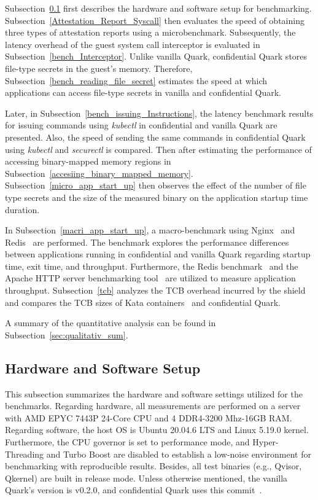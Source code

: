 Subsection~\ref{Hardware_and_Software_Setup} first describes the hardware and software setup for benchmarking. Subsection~\ref{Attestation_Report_Syscall} then evaluates the speed of obtaining three types of attestation reports using a microbenchmark. Subsequently, the latency overhead of the guest system 
call interceptor is evaluated in Subsection~\ref{bench_Interceptor}. Unlike vanilla Quark, confidential Quark stores file-type secrets in the guest's memory. Therefore, Subsection~\ref{bench_reading_file_secret} estimates the speed at which applications can access file-type secrets in vanilla and confidential Quark.
 
Later, in Subsection~\ref{bench_issuing_Instructions}, the latency benchmark results for issuing commands using \emph{kubectl} in confidential and vanilla Quark are presented. Also, the speed of sending the same commands in confidential Quark using \emph{kubectl} and \emph{securectl} is compared. Then after 
estimating the performance of accessing binary-mapped memory regions in Subsection~\ref{accesiing_binary_mapped_memory}. Subsection~\ref{micro_app_start_up} then observes the effect of the number of file type secrets and the size of the measured binary on the application startup time duration.


In Subsection~\ref{macri_app_start_up},  a macro-benchmark using Nginx~\cite*{nginx} and Redis~\cite*{redis} are performed. The benchmark explores the performance differences between applications running in confidential and vanilla Quark regarding startup time, exit time, and throughput. Furthermore, the Redis benchmark~\cite*{Redis_benchmark} and the 
Apache HTTP server benchmarking tool~\cite*{ab} are utilized to measure application throughput. Subsection~\ref{tcb} analyzes the TCB overhead incurred by the shield and compares the TCB sizes of Kata containers~\cite*{Kata-Containers} and confidential Quark.  

A summary of the quantitative analysis can be found in Subsection~\ref{sec:qualitativ_sum}.



\subsection{Hardware and Software Setup}\label{Hardware_and_Software_Setup}

This subsection summarizes the hardware and software settings utilized for the benchmarks. Regarding hardware, all measurements are performed on a server with AMD EPYC 7443P 24-Core CPU and 4 DDR4-3200 Mhz-16GB RAM. Regarding software, the host OS is Ubuntu 20.04.6 LTS and Linux 5.19.0 kernel. 
Furthermore, the CPU governor is set to performance mode, and Hyper-Threading and Turbo Boost are disabled to establish a low-noise environment for benchmarking with reproducible results. Besides, all test binaries (e.g., Qvisor, Qkernel) are built in 
release mode. Unless otherwise mentioned, the vanilla Quark's version is v0.2.0, and confidential Quark uses this commit~\cite*{qualitativ_confidentail_quark}.


